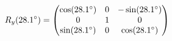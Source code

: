 \documentclass[preview]{standalone}
\begin{document}
\begin{align*}
\special{dvisvgm:raw <g id='unique000'>}R_y(28.1^\circ) = \begin{pmatrix} \cos(28.1^\circ) & 0 & -\sin(28.1^\circ) \\ 0 & 1 & 0 \\ \sin(28.1^\circ) & 0 & \cos(28.1^\circ) \end{pmatrix}\special{dvisvgm:raw </g>}
\end{align*}
\end{document}
